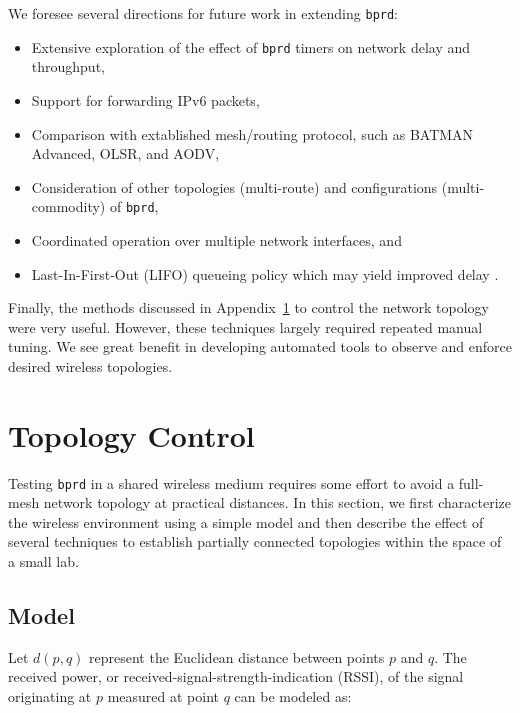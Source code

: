 \documentclass{article}
\newenvironment{myitemize}{
	\begin{itemize}
	\setlength{\itemsep}{1pt}
	\setlength{\parskip}{0pt}
	\setlength{\parsep}{0pt}}{\end{itemize}
	}
\newcommand{\bprd}{\texttt{bprd}\xspace}
\begin{document}
We foresee several directions for future work in extending \bprd:
%
\begin{myitemize}
  \item Extensive exploration of the effect of \bprd timers on network delay and throughput,
  \item Support for forwarding IPv6 packets,
  \item Comparison with extablished mesh/routing protocol, such as BATMAN Advanced, OLSR, and AODV,
  \item Consideration of other topologies (multi-route) and configurations (multi-commodity) of \bprd,
  \item Coordinated operation over multiple network interfaces, and
  \item Last-In-First-Out (LIFO) queueing policy which may yield improved delay \cite{HuaMoeNee2011}.
\end{myitemize}

Finally, the methods discussed in Appendix~\ref{sec:topology} to control the network topology were very useful.
However, these techniques largely required repeated manual tuning.
We see great benefit in developing automated tools to observe and enforce desired wireless topologies.





\appendix


\section{Topology Control}\label{sec:topology}

Testing \bprd in a shared wireless medium requires some effort to avoid a full-mesh network topology at practical distances.
In this section, we first characterize the wireless environment using a simple model and then describe the effect of several techniques to establish partially connected topologies within the space of a small lab.


\subsection{Model}\label{sec:topo-model}

Let \(d(p,q)\) represent the Euclidean distance between points \(p\) and \(q\).
The received power, or received-signal-strength-indication (RSSI), of the signal originating at \(p\) measured at point \(q\) can be modeled as:
\end{document}
